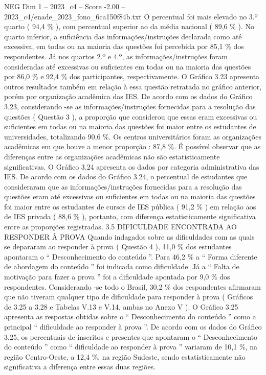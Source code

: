\begin{textsample}{NEG Dim 1 – 2023\_c4 – Score -2.00 – 2023\_c4/enade\_2023\_fono\_6ca150f84b.txt}
O percentual foi mais elevado no 3.º quarto ( 94,4 \% ), com percentual superior ao da média nacional ( 89,6 \% ).
No quarto inferior, a suficiência das informações/instruções declarada como até excessiva, em todas ou na maioria das questões foi percebida por 85,1 \% dos respondentes.
Já nos quartos 2.º e 4.º, as informações/instruções foram consideradas até excessivas ou suficientes em todas ou na maioria das questões por 86,0 \% e 92,4 \% dos participantes, respectivamente.
O Gráfico 3.23 apresenta outros resultados também em relação à essa questão retratada no gráfico anterior, porém por organização acadêmica das IES.
De acordo com os dados do Gráfico 3.23, considerando -se as informações/instruções fornecidas para a resolução das questões ( Questão 3 ), a proporção que considerou que essas eram excessivas ou suficientes em todas ou na maioria das questões foi maior entre os estudantes de universidades, totalizando 90,6 \%.
Os centros universitários foram as organizações acadêmicas em que houve a menor proporção : 87,8 \%.
É possível observar que as diferenças entre as organizações acadêmicas não são estatisticamente significativas.
O Gráfico 3.24 apresenta os dados por categoria administrativa das IES.
De acordo com os dados do Gráfico 3.24, o percentual de estudantes que consideraram que as informações/instruções fornecidas para a resolução das questões eram até excessivas ou suficientes em todas ou na maioria das questões foi maior entre os estudantes de cursos de IES pública ( 91,2 \% ) em relação aos de IES privada ( 88,6 \% ), portanto, com diferença estatisticamente significativa entre as proporções registradas. 3.5 DIFICULDADE ENCONTRADA AO RESPONDER À PROVA Quando indagados sobre as dificuldades com as quais se depararam ao responder à prova ( Questão 4 ), 11,0 \% dos estudantes apontaram o “ Desconhecimento do conteúdo ”.
Para 46,2 \% a “ Forma diferente de abordagem do conteúdo ” foi indicada como dificuldade.
Já a “ Falta de motivação para fazer a prova ” foi a dificuldade apontada por 9,0 \% dos respondentes.
Considerando -se todo o Brasil, 30,2 \% dos respondentes afirmaram que não tiveram qualquer tipo de dificuldade para responder à prova ( Gráficos de 3.25 a 3.28 e Tabelas V.13 e V.14, ambas no Anexo V ).
O Gráfico 3.25 apresenta as respostas obtidas sobre o “ Desconhecimento do conteúdo ” como a principal “ dificuldade ao responder à prova ”.
De acordo com os dados do Gráfico 3.25, os percentuais de inscritos e presentes que apontaram o “ Desconhecimento do conteúdo ” como “ dificuldade ao responder à prova ” variaram de 10,1 \%, na região Centro-Oeste, a 12,4 \%, na região Sudeste, sendo estatisticamente não significativa a diferença entre essas duas regiões.

\end{textsample}

